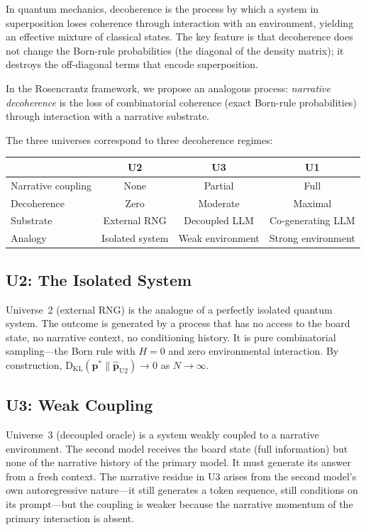 \documentclass[12pt,a4paper]{article}
\theoremstyle{definition}
\theoremstyle{remark}
\newcommand{\KL}{\mathrm{D}_{\mathrm{KL}}}
\begin{document}
In quantum mechanics, decoherence is the process by which a system in
superposition loses coherence through interaction with an environment,
yielding an effective mixture of classical states.  The key feature
is that decoherence does not change the Born-rule probabilities
(the diagonal of the density matrix); it destroys the off-diagonal
terms that encode superposition.

In the Rosencrantz framework, we propose an analogous process:
\emph{narrative decoherence} is the loss of combinatorial coherence
(exact Born-rule probabilities) through interaction with a narrative
substrate.

The three universes correspond to three decoherence regimes:

\begin{center}
\begin{tabular}{@{}lccc@{}}
  \toprule
  & \textbf{U2} & \textbf{U3} & \textbf{U1} \\
  \midrule
  Narrative coupling & None & Partial & Full \\
  Decoherence & Zero & Moderate & Maximal \\
  Substrate & External RNG & Decoupled LLM & Co-generating LLM \\
  Analogy & Isolated system & Weak environment & Strong environment \\
  \bottomrule
\end{tabular}
\end{center}

\subsection{U2: The Isolated System}

Universe~2 (external RNG) is the analogue of a perfectly isolated
quantum system.  The outcome is generated by a process that has no
access to the board state, no narrative context, no conditioning
history.  It is pure combinatorial sampling---the Born rule with
$H = 0$ and zero environmental interaction.  By construction,
$\KL(\mathbf{p}^* \| \hat{\mathbf{p}}_{\mathrm{U2}}) \to 0$
as $N \to \infty$.

\subsection{U3: Weak Coupling}

Universe~3 (decoupled oracle) is a system weakly coupled to a
narrative environment.  The second model receives the board state
(full information) but none of the narrative history of the primary
model.  It must generate its answer from a fresh context.  The
narrative residue in U3 arises from the second model's own
autoregressive nature---it still generates a token sequence, still
conditions on its prompt---but the coupling is weaker because the
narrative momentum of the primary interaction is absent.
\end{document}
